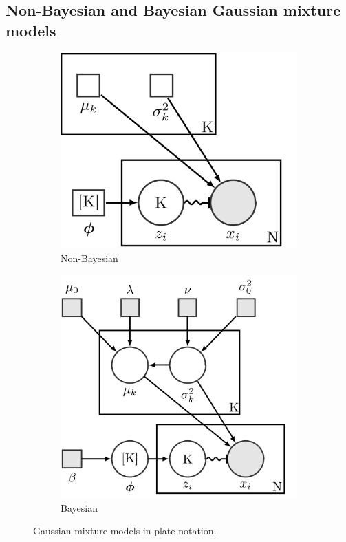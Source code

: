 \documentclass[conference]{IEEEtran}
\begin{document}
\subsection{Non-Bayesian and Bayesian Gaussian mixture models}

\begin{figure}[H]
    \centering
    \begin{subfigure}[b]{.4\linewidth}
        \centering
        \includegraphics[width=1\linewidth]{images/ComE/GMM.png}
        \caption{Non-Bayesian}
    \end{subfigure}%
    \begin{subfigure}[b]{.5\linewidth}
        \centering
        \includegraphics[width=1\linewidth]{images/ComE/BGMM.png}
        \caption{Bayesian}
    \end{subfigure}%
    \caption{Gaussian mixture models in plate notation\protect\footnotemark.}
    \label{fig:GMM_vs_BGMM_plates}
\end{figure}
\end{document}
